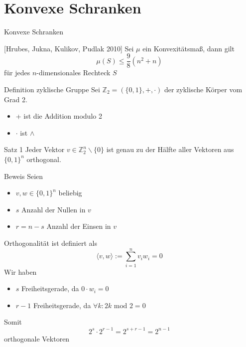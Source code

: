 \section{Konvexe Schranken}
\begin{frame}{Konvexe Schranken}
    \begin{block}{[Hrubes, Jukna, Kulikov, Pudlak 2010]}
        Sei $\mu$ ein Konvexit\"atsma\ss{}, dann gilt
        \[
            \mu(S) \leq \frac{9}{8} (n^2+n)
        \]
        f\"ur jedes $n$-dimensionales Rechteck $S$
    \end{block}
\end{frame}

\begin{frame}
    \begin{block}{Definition zyklische Gruppe}
        Sei $\mathbb{Z}_2 = (\{0,1\}, +, \cdot)$
        der zyklische K\"orper vom Grad 2. \\
        \begin{itemize}
            \item + ist die Addition modulo 2
            \item $\cdot$ ist $\wedge$
        \end{itemize}
    \end{block}
    \pause
    \begin{block}{Satz 1}
        Jeder Vektor $v \in \mathbb{Z}_2^n \backslash \{0\}$ ist genau zu der H\"alfte aller Vektoren aus $\{0,1\}^n$ orthogonal.
    \end{block}
\end{frame}

\begin{frame}[t]{Beweis}
    Seien
    \begin{itemize}
        \item $v,w \in \{0,1\}^n$ beliebig
        \item $s$ Anzahl der Nullen in $v$
        \item $r = n-s$ Anzahl der Einsen in $v$
    \end{itemize}
    \pause
    Orthogonalit\"at ist definiert als
    \[
        \langle v,w \rangle := \sum_{i=1}^n v_i w_i = 0
    \]
    \pause
    Wir haben
    \begin{itemize}
        \item $s$ Freiheitsgerade, da $0 \cdot w_i = 0$
        \item $r-1$ Freiheitsgerade, da $\forall k : 2k \text{ mod } 2 = 0$
    \end{itemize}
    \pause
    Somit
    \[
        2^s \cdot 2^{r-1} = 2^{s+r-1} = 2^{n-1}
    \]
    orthogonale Vektoren
\end{frame}

